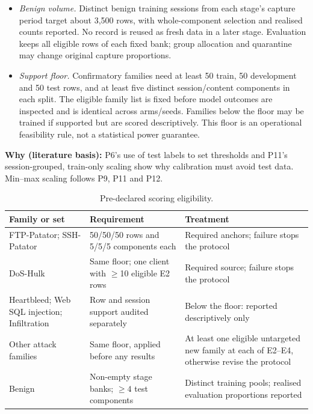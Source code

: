 \documentclass[10pt,a4paper]{article}
\newcommand{\why}[1]{\par\nopagebreak[4]\noindent\colorbox{black!5}{\parbox{\dimexpr\linewidth-2\fboxsep}{\small\textbf{Why (literature basis):} #1}}\par}
\begin{document}
\begin{itemize}
\item \emph{Benign volume.} Distinct benign training sessions from each stage's capture period target about 3,500 rows, with whole-component selection and realised counts reported. No record is reused as fresh data in a later stage. Evaluation keeps all eligible rows of each fixed bank; group allocation and quarantine may change original capture proportions.
\item \emph{Support floor.} Confirmatory families need at least 50 train, 50 development and 50 test rows, and at least five distinct session/content components in each split. The eligible family list is fixed before model outcomes are inspected and is identical across arms/seeds. Families below the floor may be trained if supported but are scored descriptively. This floor is an operational feasibility rule, not a statistical power guarantee.
\end{itemize}

\why{P6's use of test labels to set thresholds and P11's session-grouped, train-only scaling show why calibration must avoid test data. Min--max scaling follows P9, P11 and P12.}

\begin{table}[H]
\centering\footnotesize
\caption{Pre-declared scoring eligibility.}
\label{tab:support}
\begin{tabularx}{\linewidth}{L{3.2cm}L{3.6cm}Y}
\toprule
Family or set & Requirement & Treatment\\
\midrule
FTP-Patator; SSH-Patator & 50/50/50 rows and 5/5/5 components each & Required anchors; failure stops the protocol\\
DoS-Hulk & Same floor; one client with $\ge$10 eligible E2 rows & Required source; failure stops the protocol\\
Heartbleed; Web SQL injection; Infiltration & Row and session support audited separately & Below the floor: reported descriptively only\\
Other attack families & Same floor, applied before any results & At least one eligible untargeted new family at each of E2--E4, otherwise revise the protocol\\
Benign & Non-empty stage banks; $\ge4$ test components & Distinct training pools; realised evaluation proportions reported\\
\bottomrule
\end{tabularx}
\end{table}
\end{document}
